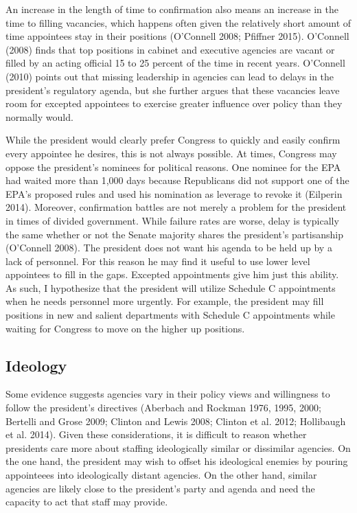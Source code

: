 \documentclass[12pt]{article}
\begin{document}
An increase in the length of time to confirmation also means an increase in the time to filling vacancies, which happens often given the relatively short amount of time appointees stay in their positions (O'Connell 2008; Pfiffner 2015). O'Connell (2008) finds that top positions in cabinet and executive agencies are vacant or filled by an acting official 15 to 25 percent of the time in recent years. O'Connell (2010) points out that missing leadership in agencies can lead to delays in the president's regulatory agenda, but she further argues that these vacancies leave room for excepted appointees to exercise greater influence over policy than they normally would.


While the president would clearly prefer Congress to quickly and easily confirm every appointee he desires, this is not always possible. At times, Congress may oppose the president's nominees for political reasons. One nominee for the EPA had waited more than 1,000 days because Republicans did not support one of the EPA's proposed rules and used his nomination as leverage to revoke it (Eilperin 2014). Moreover, confirmation battles are not merely a problem for the president in times of divided government. While failure rates are worse, delay is typically the same whether or not the Senate majority shares the president's partisanship (O'Connell 2008). The president does not want his agenda to be held up by a lack of personnel. For this reason he may find it useful to use lower level appointees to fill in the gaps. Excepted appointments give him just this ability. As such, I hypothesize that the president will utilize Schedule C appointments when he needs personnel more urgently. For example, the president may fill positions in new and salient departments with Schedule C appointments while waiting for Congress to move on the higher up positions.

\subsection*{Ideology}

Some evidence suggests agencies vary in their policy views and willingness to follow the president's directives (Aberbach and Rockman 1976, 1995, 2000; Bertelli and Grose 2009; Clinton and Lewis 2008; Clinton et al. 2012; Hollibaugh et al. 2014). Given these considerations, it is difficult to reason whether presidents care more about staffing ideologically similar or dissimilar agencies. On the one hand, the president may wish to offset his ideological enemies by pouring appointeees into ideologically distant agencies. On the other hand, similar agencies are likely close to the president's party and agenda and need the capacity to act that staff may provide.
\end{document}
